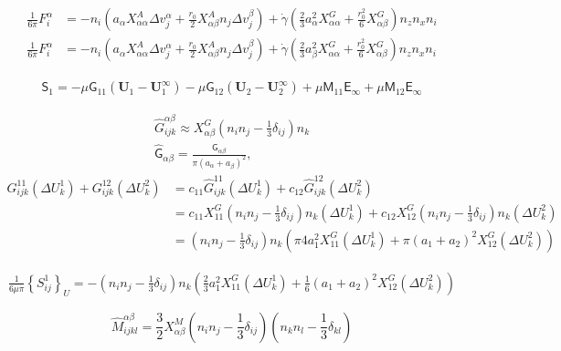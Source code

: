 \documentclass[11pt]{scrartcl}
\newcommand{\tens}[1]{\bm{\mathsf{#1}}}
\begin{document}
\begin{align}
\frac{1}{6\pi} F^{\alpha}_i
&= -n_i \left(
a_{\alpha} X_{\alpha\alpha}^{A} \Delta v^{\alpha}_j
+ \frac{r_0}{2} 
X_{\alpha\beta}^{A} n_j \Delta v^{\beta}_j
\right) 
 +
\dot{\gamma}
\left( \frac{2}{3} a_{\alpha}^2   X_{\alpha\alpha}^{G} 
 + \frac{r_0^2}{6} X_{\alpha\beta}^{G} \right)n_z n_x  n_i \\
\frac{1}{6\pi} F^{\alpha}_i
&= -n_i \left(
a_{\alpha} X_{\alpha\alpha}^{A} \Delta v^{\alpha}_j
+ \frac{r_0}{2} 
X_{\alpha\beta}^{A} n_j \Delta v^{\beta}_j
\right)
 + 
\dot{\gamma}
\left( \frac{2}{3} a_{\beta}^2 X_{\alpha\alpha}^{G}
  + \frac{r_0^2}{6} X_{\alpha\beta}^{G}\right)
n_z n_x n_i
\end{align}

\begin{align}
\tens{S}_1
 = 
- \mu \tens{G}_{11} (\bm{U}_1-\bm{U}_1^{\infty})
- \mu \tens{G}_{12} (\bm{U}_2-\bm{U}_2^{\infty})
+ \mu \tens{M}_{11} \tens{E}_{\infty}
+ \mu \tens{M}_{12} \tens{E}_{\infty}
\end{align}

\begin{gather}
 \hat{G}_{ijk}^{\alpha \beta}
\approx 
X_{\alpha\beta}^{G} 
\left(n_i n_j - \frac{1}{3}\delta_{ij}\right)n_k\\
 \hat{\tens{G}}_{\alpha\beta}
= \frac{\tens{G}_{\alpha\beta}}{\pi(a_{\alpha} + a_{\beta})^2},
\end{gather}
\begin{align}
 G^{11}_{ijk} (\Delta U^{1}_k)
+ G^{12}_{ijk} (\Delta U^{2}_k)
&= c_{11} \hat{G}^{11}_{ijk} (\Delta U^{1}_k)
+ c_{12} \hat{G}^{12}_{ijk} (\Delta U^{2}_k) \\
&= c_{11} X_{11}^{G}(n_i n_j - \frac{1}{3}\delta_{ij}) n_k (\Delta U^{1}_k)
+ c_{12} X_{12}^{G}(n_i n_j - \frac{1}{3}\delta_{ij}) n_k  (\Delta U^{2}_k) \\
&=
(n_i n_j - \frac{1}{3}\delta_{ij}) n_k
\left(
\pi 4 a_1^2 X_{11}^{G} (\Delta U^{1}_k)
+ 
\pi (a_1+a_2)^2 X_{12}^{G} (\Delta U^{2}_k)
\right)
\end{align}

\begin{align}
\frac{1}{6\mu\pi} 
\left\{
 S^{1}_{ij}
\right\}_{U}
= - 
(n_i n_j - \frac{1}{3}\delta_{ij}) n_k
\left(
 \frac{2}{3} a_1^2 X_{11}^{G} (\Delta U^{1}_k)
+ 
\frac{1}{6}
 (a_1+a_2)^2 X_{12}^{G} (\Delta U^{2}_k)
\right)
\end{align}



\begin{equation}
 \hat{M}_{ijkl}^{\alpha\beta}
=  \frac{3}{2}
X_{\alpha\beta}^{M}
 \left(n_i n_j
 - \frac{1}{3} \delta_{ij}
\right)
 \left(n_k n_l
 - \frac{1}{3} \delta_{kl}
\right)  
\end{equation}
\end{document}
